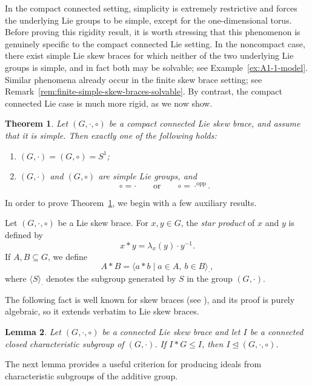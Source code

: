\documentclass[reqno]{amsart}
\newtheorem{theorem}{Theorem}[section]
\newtheorem{lemma}[theorem]{Lemma}
\begin{document}
In the compact connected setting, simplicity is extremely restrictive and
forces the underlying Lie groups to be simple, except for the one-dimensional
torus. Before proving this rigidity result, it is worth stressing that this
phenomenon is genuinely specific to the compact connected Lie setting. 
In the noncompact case, there exist simple Lie skew braces for which
neither of the two underlying Lie groups is simple, and in fact both
may be solvable; see Example~\ref{ex:A1-1-model}. Similar phenomena
already occur in the finite skew brace setting; see
Remark~\ref{rem:finite-simple-skew-braces-solvable}.
By contrast, the compact connected Lie case is much more rigid, as we now
show.

\begin{theorem}\label{thm:main-compact-simple}
Let $(G,\cdot,\circ)$ be a compact connected Lie skew brace, and assume that it
is simple. Then exactly one of the following holds:
\begin{enumerate}[label=\textup{(\alph*)}]
    \item $(G,\cdot)=(G,\circ)=S^1$;
    \item $(G,\cdot)$ and $(G,\circ)$ are simple Lie groups, and
    \[
    \circ=\cdot
    \qquad\text{or}\qquad
    \circ=\cdot^{\mathrm{opp}}.
    \]
\end{enumerate}
\end{theorem}

In order to prove Theorem~\ref{thm:main-compact-simple}, we begin with a few
auxiliary results.

Let $(G,\cdot,\circ)$ be a Lie skew brace. For $x,y\in G$, the \emph{star
product} of $x$ and $y$ is defined by
\[
x*y=\lambda_x(y)\cdot y^{-1}.
\]
If $A,B\subseteq G$, we define
\[
A*B=\langle a*b \mid a\in A,\ b\in B\rangle_{\cdot},
\]
where $\langle S\rangle_{\cdot}$ denotes the subgroup generated by $S$ in the
group $(G,\cdot)$.

The following fact is well known for skew braces (see
\cite[Lemma~1.9]{CedoSmoktunowiczVendramin2018}), and its proof is purely
algebraic, so it extends verbatim to Lie skew braces.

\begin{lemma}\label{lem:char-star-ideal}
Let $(G,\cdot,\circ)$ be a connected Lie skew brace and let $I$ be a connected
closed characteristic subgroup of $(G,\cdot)$. If $I*G\leq I$, then
$I\trianglelefteq (G,\cdot,\circ)$.
\end{lemma}

The next lemma provides a useful criterion for producing ideals from
characteristic subgroups of the additive group.
\end{document}
